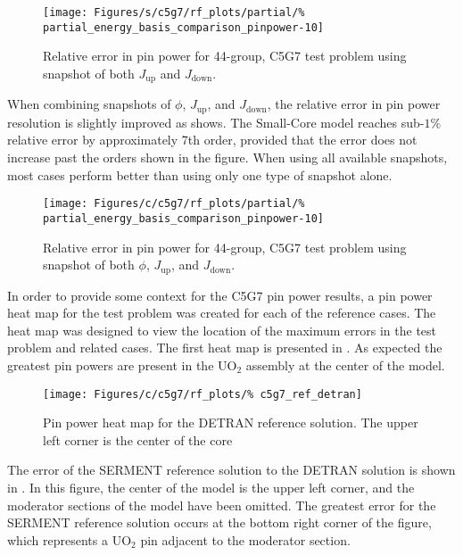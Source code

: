 \begin{figure*}[tb]
    \centering
    \texttt{[image: Figures/s/c5g7/rf\_plots/partial/\%
        partial\_energy\_basis\_comparison\_pinpower-10]}
    \caption{Relative error in pin power for 44-group, C5G7 test problem 
using snapshot of both $J_{\text{up}}$ and $J_{\text{down}}$.}
    \label{fig:c5g7-partial-pp}
\end{figure*}

When combining snapshots of $\phi$, $J_{\text{up}}$, and $J_{\text{down}}$, the relative 
error in pin power resolution is slightly improved as  shows.  The 
Small-Core model reaches sub-$1\%$ relative 
error by approximately 7th order, provided that the error does not increase 
past the orders shown in the figure.  When using all available snapshots, most 
cases perform better than using only one type of snapshot alone.

\begin{figure*}[tb]
    \centering
    \texttt{[image: Figures/c/c5g7/rf\_plots/partial/\%
        partial\_energy\_basis\_comparison\_pinpower-10]}
    \caption{Relative error in pin power for 44-group, C5G7 test problem 
using snapshot of both $\phi$, $J_{\text{up}}$, and $J_{\text{down}}$.}
    \label{fig:c5g7-combined-pp}
\end{figure*}

In order to provide some context for the C5G7 pin power results, a pin power 
heat map for the test problem was created for each of the reference cases.  The 
heat map was designed to view the location of the maximum errors in the test 
problem and related cases. The first heat map is presented in 
.  As expected the greatest pin powers are present in the 
UO$_2$ assembly at the center of the model.
    
\begin{figure*}[tb]
    \centering
    \texttt{[image: Figures/c/c5g7/rf\_plots/\%
        c5g7\_ref\_detran]}
    \caption{Pin power heat map for the DETRAN reference solution.  The 
upper left corner is the center of the core}
    \label{fig:pin_detran}
\end{figure*}

The error of the SERMENT reference solution to the DETRAN solution 
is shown in .  In this figure, the center of the model is the 
upper left corner, and the moderator sections of the model have been omitted.  
The greatest error for the SERMENT reference solution occurs at the 
bottom right corner of the figure, which represents a UO$_2$ pin adjacent to 
the moderator section.

